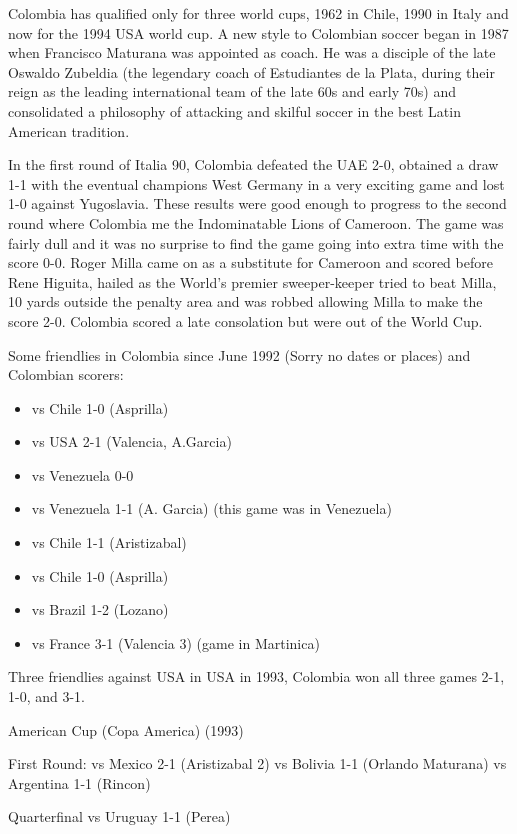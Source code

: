 Colombia has qualified only for three world cups, 1962 in Chile, 1990 in Italy
and now for the 1994 USA world cup. A new style to Colombian soccer began in 
1987 when Francisco Maturana was appointed as coach. He was a disciple of the 
late Oswaldo Zubeldia (the legendary coach of Estudiantes de la Plata, during 
their reign as the leading international team of the late 60s and early 70s)
and consolidated a philosophy of attacking and skilful soccer in the best Latin
American tradition.

In the first round of Italia 90, Colombia defeated the UAE 2-0, obtained a 
draw 1-1 with the eventual champions West Germany in a very exciting game and
lost 1-0 against Yugoslavia. These results were good enough to progress to the
second round where Colombia me the Indominatable Lions of Cameroon. The game 
was fairly dull and it was no surprise to find the game going into extra time
with the score 0-0. Roger Milla came on as a substitute for Cameroon and scored
before Rene Higuita, hailed as the World's premier sweeper-keeper tried to beat
Milla, 10 yards outside the penalty area and was robbed allowing Milla to make 
the score 2-0. Colombia scored a late consolation but were out of the World 
Cup.

Some friendlies in Colombia since June 1992 (Sorry no dates or places) and Colombian scorers:
\begin{itemize}
\item vs Chile 1-0 (Asprilla)
\item vs USA 2-1 (Valencia, A.Garcia)
\item vs Venezuela 0-0
\item vs Venezuela 1-1 (A. Garcia) (this game was in Venezuela)
\item vs Chile 1-1 (Aristizabal)
\item vs Chile 1-0 (Asprilla)
\item vs Brazil 1-2 (Lozano)
\item vs France 3-1 (Valencia 3) (game in Martinica)
\end{itemize}
 
Three friendlies against USA in USA in 1993, Colombia won all three games 2-1, 1-0, and 3-1.
 
American Cup (Copa America) (1993)
 
First Round:
vs Mexico      2-1 (Aristizabal 2)
vs Bolivia     1-1 (Orlando Maturana)
vs Argentina   1-1 (Rincon)
 
Quarterfinal
vs Uruguay     1-1 (Perea)
 
